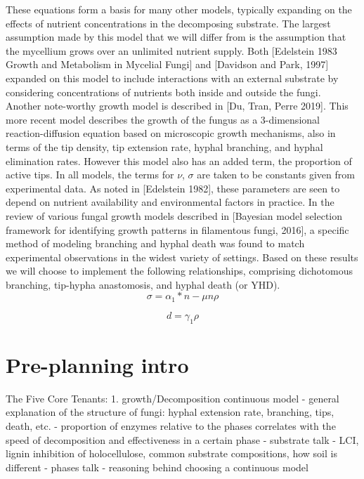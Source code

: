 \documentclass[12pt]{article}
\begin{document}
\begin{multicols}{2}
These equations form a basis for many other models, typically expanding on the effects of nutrient concentrations in the decomposing substrate. The largest assumption made by this model that we will differ from is the assumption that the mycellium grows over an unlimited nutrient supply. Both [Edelstein 1983 Growth and Metabolism in Mycelial Fungi] and [Davidson and Park, 1997] expanded on this model to include interactions with an external substrate by considering concentrations of nutrients both inside and outside the fungi. 
\\ Another note-worthy growth model is described in [Du, Tran, Perre 2019]. This more recent model describes the growth of the fungus as a 3-dimensional reaction-diffusion equation based on microscopic growth mechanisms, also in terms of the tip density, tip extension rate, hyphal branching, and hyphal elimination rates. However this model also has an added term, the proportion of active tips. In all models, the terms for $\nu$, $\sigma$ are taken to be constants given from experimental data. As noted in [Edelstein 1982], these parameters are seen to depend on nutrient availability and environmental factors in practice. In the review of various fungal growth models described in [Bayesian model selection framework for identifying growth patterns in filamentous fungi, 2016], a specific method of modeling branching and hyphal death was found to match experimental observations in the widest variety of settings. Based on these results we will choose to implement the following relationships, comprising dichotomous branching, tip-hypha anastomosis, and hyphal death (or YHD). 
\begin{equation} \label {eq}
\sigma = \alpha_{1}*n - \mu n \rho
\end{equation}

\begin{equation} \label {eq}
d = \gamma_{1}\rho
\end{equation}

\section{Pre-planning intro}

The Five Core Tenants:
1. growth/Decomposition continuous model
- general explanation of the structure of fungi: hyphal extension rate, branching, tips, death, etc.
- proportion of enzymes relative to the phases correlates with the speed of decomposition and effectiveness in a certain phase
- substrate talk - LCI, lignin inhibition of holocellulose, common substrate compositions, how soil is different
- phases talk
- reasoning behind choosing a continuous model


\end{multicols}
\end{document}
